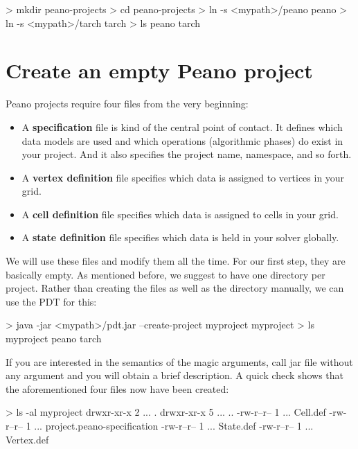 \begin{code}
> mkdir peano-projects
> cd peano-projects
> ln -s <mypath>/peano peano
> ln -s <mypath>/tarch tarch
> ls
  peano   tarch
\end{code}




\section{Create an empty Peano project}

Peano projects require four files from the very beginning:

\begin{itemize}
  \item A {\bf specification} file is kind of the central point of contact. It
  defines which data models are used and which operations (algorithmic phases)
  do exist in your project. And it also specifies the project name, namespace,
  and so forth.
  \item A {\bf vertex definition} file specifies which data is assigned to
  vertices in your grid.
  \item A {\bf cell definition} file specifies which data is assigned to
  cells in your grid.
  \item A {\bf state definition} file specifies which data is held in your
  solver globally.
\end{itemize}


\noindent
We will use these files and modify them all the time. For our first step, they
are basically empty.
As mentioned before, we suggest to have one directory per project.
Rather than creating the files as well as the directory manually, we can use the
PDT for this:

\begin{code}
> java -jar <mypath>/pdt.jar  --create-project myproject myproject 
> ls
  myproject  peano  tarch
\end{code}

\noindent
If you are interested in the semantics of the magic arguments, call jar file
without any argument and you will obtain a brief description.
A quick check shows that the aforementioned four files now have been created:


\begin{code}
> ls -al myproject
drwxr-xr-x 2 ...  .
drwxr-xr-x 5 ...  ..
-rw-r--r-- 1 ...  Cell.def
-rw-r--r-- 1 ...  project.peano-specification
-rw-r--r-- 1 ...  State.def
-rw-r--r-- 1 ...  Vertex.def
\end{code}


